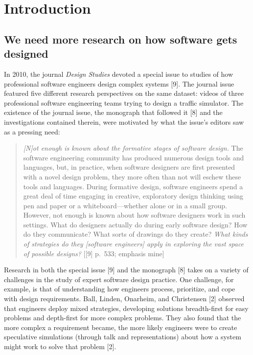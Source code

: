 \section{Introduction}\label{introduction}

\subsection{We need more research on how software gets designed}\label{we-need-more-research-on-how-software-gets-designed}

In 2010, the journal \emph{Design Studies} devoted a special issue to studies of how professional software engineers design complex systems {[}9{]}. The journal issue featured five different research perspectives on the same dataset: videos of three professional software engineering teams trying to design a traffic simulator. The existence of the journal issue, the monograph that followed it {[}8{]} and the investigations contained therein, were motivated by what the issue's editors saw as a pressing need:

\begin{quote}
\emph{{[}N{]}ot enough is known about the formative stages of software design.} The software engineering community has produced numerous design tools and languages, but, in practice, when software designers are first presented with a novel design problem, they more often than not will eschew these tools and languages. During formative design, software engineers spend a great deal of time engaging in creative, exploratory design thinking using pen and paper or a whiteboard---whether alone or in a small group. However, not enough is known about how software designers work in such settings. What do designers actually do during early software design? How do they communicate? What sorts of drawings do they create? \emph{What kinds of strategies do they {[}software engineers{]} apply in exploring the vast space of possible designs?} {[}{[}9{]} p.~533; emphasis mine{]}
\end{quote}

Research in both the special issue {[}9{]} and the monograph {[}8{]} takes on a variety of challenges in the study of expert software design practice. One challenge, for example, is that of understanding how engineers process, prioritize, and cope with design requirements. Ball, Linden, Onarheim, and Christensen {[}2{]} observed that engineers deploy mixed strategies, developing solutions breadth-first for easy problems and depth-first for more complex problems. They also found that the more complex a requirement became, the more likely engineers were to create speculative simulations (through talk and representations) about how a system might work to solve that problem {[}2{]}.

